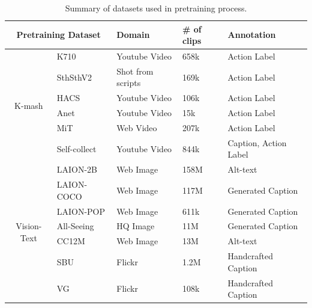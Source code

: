 \begin{table}[ht]
\centering
\caption{Summary of datasets used in \modelname{} pretraining process.}
\resizebox{0.82\textwidth}{!}
{
\begin{tabular}{cllll}
\toprule
\multicolumn{2}{c}{Pretraining   Dataset}                         & Domain            & \# of clips & Annotation            \\ \midrule
\multicolumn{1}{c|}{\multirow{6}{*}{K-mash}}        & K710         & Youtube Video     & 658k        & Action Label          \\
\multicolumn{1}{c|}{}                              & SthSthV2     & Shot from scripts & 169k        & Action Label          \\
\multicolumn{1}{c|}{}                              & HACS         & Youtube Video     & 106k        & Action Label          \\
\multicolumn{1}{c|}{}                              & Anet         & Youtube Video     & 15k         & Action Label          \\
\multicolumn{1}{c|}{}                              & MiT          & Web Video         & 207k        & Action Label          \\
\multicolumn{1}{c|}{}                              & Self-collect & Youtube Video     & 844k        & Caption, Action Label \\ \midrule
\multicolumn{1}{c|}{\multirow{11}{*}{Vision-Text}} & LAION-2B     & Web Image         & 158M        & Alt-text              \\
\multicolumn{1}{c|}{}                              & LAION-COCO    & Web Image         & 117M   & Generated Caption     \\
\multicolumn{1}{c|}{}                              & LAION-POP    & Web Image         & 611k        & Generated Caption     \\
\multicolumn{1}{c|}{}                              & All-Seeing   & HQ Image          & 11M         & Generated Caption     \\
\multicolumn{1}{c|}{}                              & CC12M        & Web Image         & 13M         & Alt-text              \\
\multicolumn{1}{c|}{}                              & SBU          & Flickr            & 1.2M        & Handcrafted  Caption  \\
\multicolumn{1}{c|}{}                              & VG           & Flickr            & 108k        & Handcrafted Caption   \\

\end{tabular}}
\end{table}
